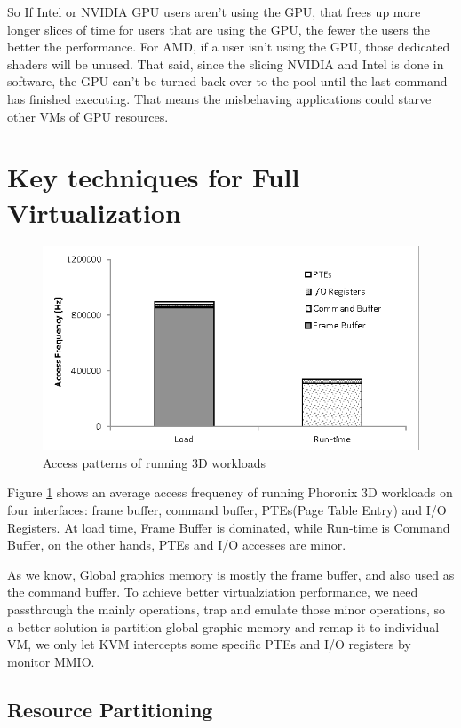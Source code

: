 \documentclass[a4paper,12pt]{article}
\begin{document}
So If Intel or NVIDIA GPU users aren’t using the GPU, that frees up more longer slices of time for users that are using the GPU, the fewer the users the better the performance. For AMD, if a user isn’t using the GPU, those dedicated shaders will be unused. That said, since the slicing NVIDIA and Intel is done in software, the GPU can’t be turned back over to the pool until the last command has finished executing. That means the misbehaving applications could starve other VMs of GPU resources.

\section{Key techniques for Full Virtualization}

\begin{figure}
\centering
  \includegraphics[width=\linewidth]{performance.png}
  \caption{Access patterns of running 3D workloads\cite{183931}}
  \label{fig:performance}
\end{figure}

Figure \ref{fig:performance} shows an average access frequency of running Phoronix 3D workloads on four interfaces: frame buffer, command buffer, PTEs(Page Table Entry) and I/O Registers. At load time, Frame Buffer is dominated, while Run-time is Command Buffer, on the other hands, PTEs and I/O accesses are minor.

As we know, Global graphics memory is mostly the frame buffer, and also used as the command buffer. To achieve better virtualziation performance, we need passthrough the mainly operations, trap and emulate those minor operations, so a better solution is partition global graphic memory and remap it to individual VM, we only let KVM intercepts some specific PTEs and I/O registers by monitor MMIO.  

\subsection{Resource Partitioning}
\end{document}

